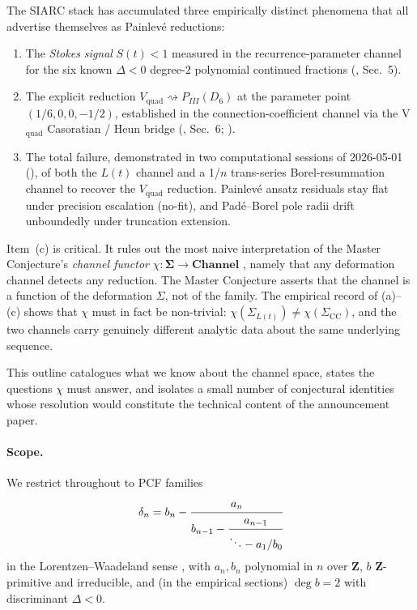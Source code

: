 \documentclass[11pt,reqno]{amsart}
\theoremstyle{plain}
\theoremstyle{definition}
\theoremstyle{remark}
\newcommand{\Channel}{\mathbf{Channel}}
\newcommand{\Sigmaspace}{\mathbf{\Sigma}}
\newcommand{\Lt}{L(t)}
\newcommand{\CC}{\mathrm{CC}}
\newcommand{\Vquad}{V_{\mathrm{quad}}}
\newcommand{\dn}{\delta_{n}}
\begin{document}
The SIARC stack has accumulated three empirically distinct
phenomena that all advertise themselves as Painlev\'e
reductions:
\begin{enumerate}[label=(\alph*)]
\item The \emph{Stokes signal} $S(t)<1$ measured in the
recurrence-parameter channel for the six known $\Delta<0$
degree-$2$ polynomial continued fractions
(\cite{siarc_pcf1_v13}, Sec.~5).
\item The explicit reduction
$\Vquad \rightsquigarrow P_{III}(D_6)$ at the parameter point
$(1/6, 0, 0, -1/2)$, established in the connection-coefficient
channel via the V$_\mathrm{quad}$ Casoratian / Heun bridge
(\cite{siarc_pcf1_v13}, Sec.~6;
\cite{slavyanov2000special, iwasaki1991from}).
\item The total failure, demonstrated in two computational
sessions of 2026-05-01 (\cite{siarc_painleve_deep_6x,
siarc_borel_5x, siarc_borel_kscan}), of both the $\Lt$ channel
and a 1/$n$ trans-series Borel-resummation channel to recover
the $\Vquad$ reduction. Painlev\'e ansatz residuals stay flat
under precision escalation (no-fit), and Pad\'e--Borel pole
radii drift unboundedly under truncation extension.
\end{enumerate}
Item~(c) is critical. It rules out the most naive interpretation
of the Master Conjecture's \emph{channel functor}
$\chi : \Sigmaspace \to \Channel$ \cite{siarc_umbrella}, namely
that any deformation channel detects any reduction. The Master
Conjecture asserts that the channel is a function of the
deformation $\Sigma$, not of the family. The empirical record
of (a)--(c) shows that $\chi$ must in fact be non-trivial:
$\chi(\Sigma_{\Lt}) \ne \chi(\Sigma_{\CC})$, and the two
channels carry genuinely different analytic data about the
same underlying sequence.

This outline catalogues what we know about the channel space,
states the questions $\chi$ must answer, and isolates a small
number of conjectural identities whose resolution would
constitute the technical content of the announcement paper.

\paragraph{Scope.}
We restrict throughout to PCF families
\[
  \dn = b_n - \cfrac{a_n}{b_{n-1} - \cfrac{a_{n-1}}{\ddots - a_1/b_0}}
\]
in the Lorentzen--Waadeland sense \cite{lorentzen2008continued},
with $a_n, b_n$ polynomial in $n$ over $\mathbf{Z}$, $b$
$\mathbf{Z}$-primitive and irreducible, and (in the empirical
sections) $\deg b = 2$ with discriminant $\Delta < 0$.
\end{document}
